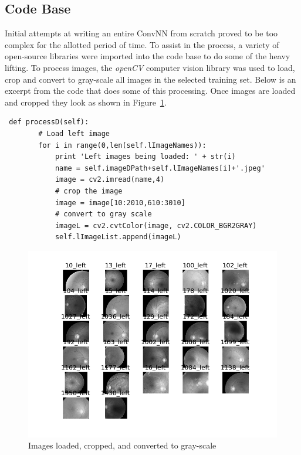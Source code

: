 \documentclass[letterpaper,12pt]{article}
\newcommand{\figref}[1]{Figure~\ref{#1}}
\begin{document}
\subsection{Code Base}


Initial attempts at writing an entire ConvNN from scratch proved to be too complex for the allotted period of time. To assist in the process, a variety of open-source libraries were imported into the code base to do some of the heavy lifting. To process images, the \textit{openCV} computer vision library was used to load, crop and convert to gray-scale all images in the selected training set. Below is an excerpt from the code that does some of this processing. Once images are loaded and cropped they look as shown in \figref{loaded}.

\begin{verbatim}
 def processD(self):
        # Load left image
        for i in range(0,len(self.lImageNames)):
            print 'Left images being loaded: ' + str(i)
            name = self.imageDPath+self.lImageNames[i]+'.jpeg'
            image = cv2.imread(name,4)
            # crop the image
            image = image[10:2010,610:3010]
            # convert to gray scale
            imageL = cv2.cvtColor(image, cv2.COLOR_BGR2GRAY)
            self.lImageList.append(imageL)
\end{verbatim}

\begin{figure}[htbp]
\begin{center}
\includegraphics[scale=0.75]{images/lInitialImages_gray.png}
\caption{Images loaded, cropped, and converted to gray-scale}
\label{loaded}
\end{center}
\end{figure}
\end{document}
